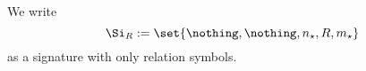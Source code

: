 
\begin{nttn}
    We write
    \[\Si_R := \set{\nothing,\nothing,n_\star,R,m_\star}\]
    as a signature with only relation symbols.
\end{nttn}


